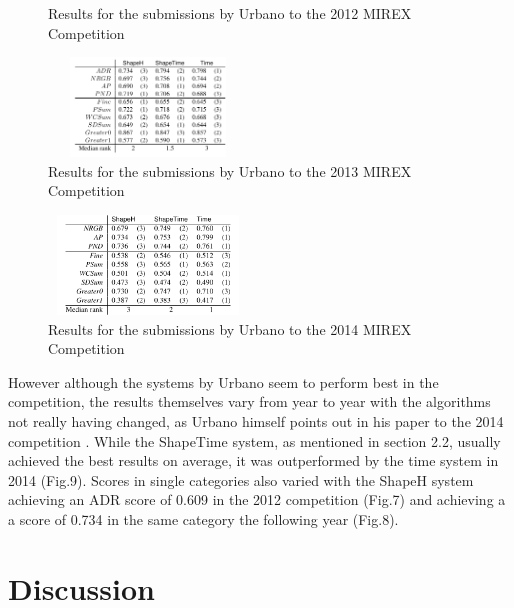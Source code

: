 \documentclass{llncs}
\begin{document}
\begin{itemize}
\begin{figure}[h!]
			\caption{Results for the submissions by Urbano to the 2012 MIREX Competition \cite{five_point_four}}
        \end{figure}
        \begin{figure}[h!]
			\centering
            \includegraphics[width=200px,height=100px,keepaspectratio]{urbano_mirex_2013_results}
			\caption{Results for the submissions by Urbano to the 2013 MIREX Competition \cite{five_point_three}}
        \end{figure}
        \begin{figure}[h!]
			\centering
            \includegraphics[width=200px,height=100px,keepaspectratio]{urbano_mirex_2014_results}
			\caption{Results for the submissions by Urbano to the 2014 MIREX Competition \cite{five_point_two}}
        \end{figure}
        
        However although the systems by Urbano seem to perform best in the competition, the results themselves vary from year to year with the algorithms not really having changed, as Urbano himself points out in his paper to the 2014 competition \cite{five_point_two}.  While the ShapeTime system, as mentioned in section 2.2, usually achieved the best results on average, it was outperformed by the time system in 2014 (Fig.9). Scores in single categories also varied with the ShapeH system achieving an ADR score of 0.609 in the 2012 competition (Fig.7) and achieving a a score of 0.734 in the same category the following year (Fig.8). 


	\section{Discussion}
	

\end{itemize}
\end{document}
